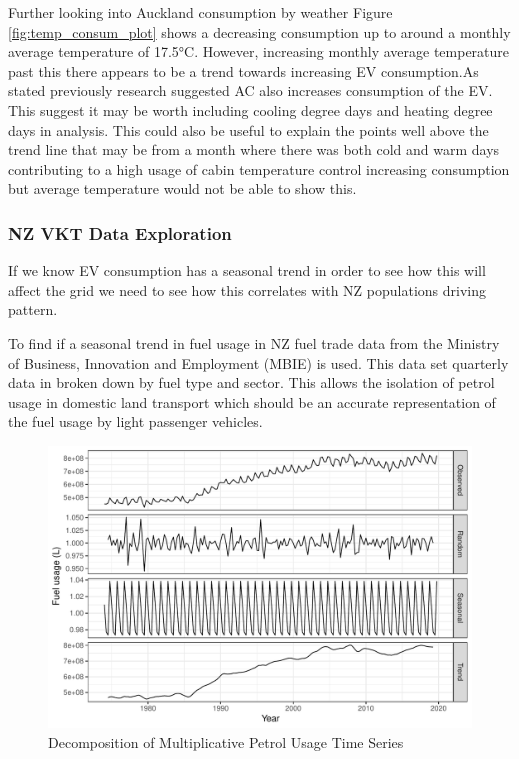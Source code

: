 \documentclass[
]{article}
\begin{document}
Further looking into Auckland consumption by weather Figure
\ref{fig:temp_consum_plot} shows a decreasing consumption up to around a
monthly average temperature of 17.5°C. However, increasing monthly
average temperature past this there appears to be a trend towards
increasing EV consumption.As stated previously research \cite{ev_range}
suggested AC also increases consumption of the EV. This suggest it may
be worth including cooling degree days and heating degree days in
analysis. This could also be useful to explain the points well above the
trend line that may be from a month where there was both cold and warm
days contributing to a high usage of cabin temperature control
increasing consumption but average temperature would not be able to show
this.

\hypertarget{nz-vkt-data-exploration}{%
\subsubsection{NZ VKT Data Exploration}\label{nz-vkt-data-exploration}}

If we know EV consumption has a seasonal trend in order to see how this
will affect the grid we need to see how this correlates with NZ
populations driving pattern.

To find if a seasonal trend in fuel usage in NZ fuel trade data
\cite{fuel_trade} from the Ministry of Business, Innovation and
Employment (MBIE) is used. This data set quarterly data in broken down
by fuel type and sector. This allows the isolation of petrol usage in
domestic land transport which should be an accurate representation of
the fuel usage by light passenger vehicles.

\begin{figure}
\centering
\includegraphics{final_report_files/figure-latex/petrol_ts-1.pdf}
\caption{Decomposition of Multiplicative Petrol Usage Time Series}
\end{figure}
\end{document}
